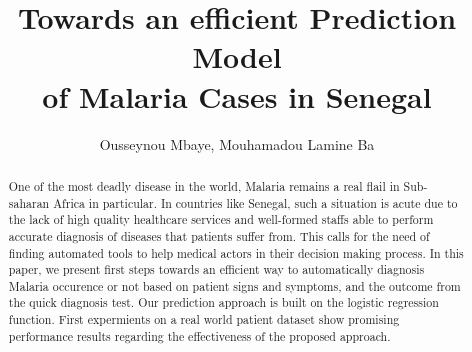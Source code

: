 \documentclass[runningheads]{llncs}
\begin{document}
%
\title{Towards an efficient Prediction Model\\ of Malaria Cases in Senegal}
%
%
\author{Ousseynou Mbaye, Mouhamadou Lamine Ba}
%
%
%
\maketitle              %
%
\begin{abstract}
One of the most deadly disease in the world, Malaria remains a real flail in Sub-saharan Africa 
in particular. In countries like Senegal, such a situation is acute due to the lack of high quality
healthcare services and well-formed staffs able to perform accurate diagnosis of diseases that patients suffer from. 
This calls for the need of finding automated tools to help medical actors in their decision making process.
In this paper, we present first steps towards an efficient way to automatically diagnosis Malaria occurence or not 
based on patient signs and symptoms, and the outcome from the quick diagnosis test. Our prediction approach is built
on the logistic regression function. First expermients on a real world patient dataset show promising performance
results regarding the effectiveness of the proposed approach.
 
\end{abstract}
%
%












%
%
%
% 
% 
%
\end{document}
